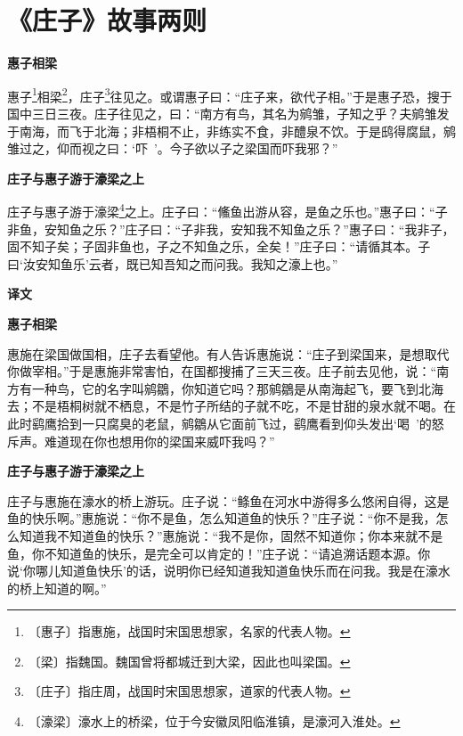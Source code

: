 \documentclass[12pt,UTF-8,openany,a4]{ctexbook}
\begin{document}
\chapter{《庄子》故事两则}

\begin{large}
    
    \begin{center}{\Large\textbf{惠子相梁}}\end{center}
    
    惠子\footnote{〔惠子〕\yiwen 指惠施，战国时宋国思想家，名家的代表人物。}相梁\footnote{〔梁〕\yiwen 指魏国。魏国曾将都城迁到大梁，因此也叫梁国。}，庄子\footnote{〔庄子〕\yiwen 指庄周，战国时宋国思想家，道家的代表人物。}往见之。或谓惠子曰：“庄子来，欲代子相。”于是惠子恐，搜于国中三日三夜。庄子往见之，曰：“南方有鸟，其名为鹓雏，子知之乎？夫鹓雏发于南海，而飞于北海；非梧桐不止，非练实不食，非醴泉不饮。于是鸱得腐鼠，鹓雏过之，仰而视之曰：‘吓~’。今子欲以子之梁国而吓我邪？”
    
    \begin{center}{\Large\textbf{庄子与惠子游于濠梁之上}}\end{center}
    
    庄子与惠子游于濠梁\footnote{〔濠梁〕\yiwen 濠水上的桥梁，位于今安徽凤阳临淮镇，是濠河入淮处。}之上。庄子曰：“鯈鱼出游从容，是鱼之乐也。”惠子曰：“子非鱼，安知鱼之乐？”庄子曰：“子非我，安知我不知鱼之乐？”惠子曰：“我非子，固不知子矣；子固非鱼也，子之不知鱼之乐，全矣！”庄子曰：“请循其本。子曰‘汝安知鱼乐’云者，既已知吾知之而问我。我知之濠上也。”
\end{large}


\newpage

\begin{Large}
    \noindent\textbf{译文}
\end{Large}


\vspace{1em}

\begin{large}
    \yiwen 
    \begin{center}{\Large\textbf{惠子相梁}}\end{center}
    
    惠施在梁国做国相，庄子去看望他。有人告诉惠施说：“庄子到梁国来，是想取代你做宰相。”于是惠施非常害怕，在国都搜捕了三天三夜。庄子前去见他，说：“南方有一种鸟，它的名字叫鹓鶵，你知道它吗？那鹓鶵是从南海起飞，要飞到北海去；不是梧桐树就不栖息，不是竹子所结的子就不吃，不是甘甜的泉水就不喝。在此时鹞鹰拾到一只腐臭的老鼠，鹓鶵从它面前飞过，鹞鹰看到仰头发出‘喝~’的怒斥声。难道现在你也想用你的梁国来威吓我吗？”
    
    \begin{center}{\Large\textbf{庄子与惠子游于濠梁之上}}\end{center}
    
    庄子与惠施在濠水的桥上游玩。庄子说：“鲦鱼在河水中游得多么悠闲自得，这是鱼的快乐啊。”惠施说：“你不是鱼，怎么知道鱼的快乐？”庄子说：“你不是我，怎么知道我不知道鱼的快乐？”惠施说：“我不是你，固然不知道你；你本来就不是鱼，你不知道鱼的快乐，是完全可以肯定的！”庄子说：“请追溯话题本源。你说‘你哪儿知道鱼快乐’的话，说明你已经知道我知道鱼快乐而在问我。我是在濠水的桥上知道的啊。”
    
\end{large}
\end{document}
